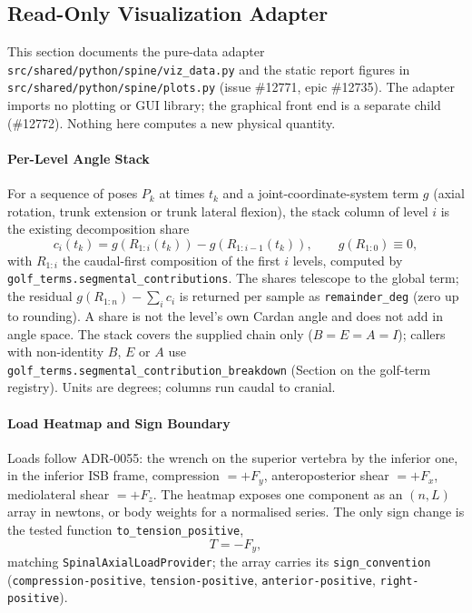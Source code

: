 \subsection{Read-Only Visualization Adapter}
\label{sec:spn-15a}

This section documents the pure-data adapter
\texttt{src/shared/python/spine/viz\_data.py} and the static report figures in
\texttt{src/shared/python/spine/plots.py} (issue \#12771, epic \#12735). The
adapter imports no plotting or GUI library; the graphical front end is a
separate child (\#12772). Nothing here computes a new physical quantity.

\paragraph{Per-Level Angle Stack}
For a sequence of poses $P_k$ at times $t_k$ and a joint-coordinate-system term
$g$ (axial rotation, trunk extension or trunk lateral flexion), the stack
column of level $i$ is the existing decomposition share
\begin{equation}
  c_i(t_k) = g\!\left(R_{1:i}(t_k)\right) - g\!\left(R_{1:i-1}(t_k)\right),
  \qquad g(R_{1:0}) \equiv 0,
\end{equation}
with $R_{1:i}$ the caudal-first composition of the first $i$ levels, computed by
\texttt{golf\_terms.segmental\_contributions}. The shares telescope to the
global term; the residual $g(R_{1:n}) - \sum_i c_i$ is returned per sample as
\texttt{remainder\_deg} (zero up to rounding). A share is not the level's own
Cardan angle and does not add in angle space. The stack covers the supplied chain only ($B=E=A=I$); callers with non-identity $B$, $E$ or $A$ use \texttt{golf\_terms.segmental\_contribution\_breakdown} (Section on the golf-term registry). Units are degrees; columns run
caudal to cranial.

\paragraph{Load Heatmap and Sign Boundary}
Loads follow ADR-0055: the wrench on the superior vertebra by the inferior one,
in the inferior ISB frame, compression $=+F_y$, anteroposterior shear $=+F_x$,
mediolateral shear $=+F_z$. The heatmap exposes one component as an
$(n,L)$ array in newtons, or body weights for a normalised series. The only
sign change is the tested function \texttt{to\_tension\_positive},
\begin{equation}
  T = -F_y,
\end{equation}
matching \texttt{SpinalAxialLoadProvider}; the array carries its
\texttt{sign\_convention} (\texttt{compression-positive},
\texttt{tension-positive}, \texttt{anterior-positive}, \texttt{right-positive}).

